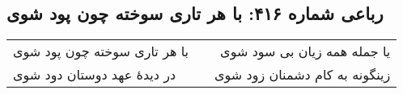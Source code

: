 \begin{center}
\section*{رباعی شماره ۴۱۶: با هر تاری سوخته چون پود شوی}
\label{sec:sh416}
\begin{longtable}{l p{0.5cm} r}
با هر تاری سوخته چون پود شوی
&&
یا جمله همه زیان بی سود شوی
\\
در دیدهٔ عهد دوستان دود شوی
&&
زینگونه به کام دشمنان زود شوی
\\
\end{longtable}
\end{center}

